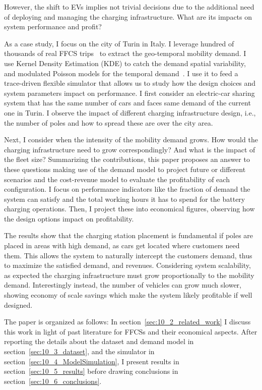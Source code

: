 However, the shift to EVs implies not trivial decisions due to the additional need of deploying and managing the charging infrastructure. What are its impacts on system performance and profit?

As a case study, I focus on the city of Turin in Italy. 
I leverage hundred of thousands of real FFCS trips~\cite{10_ciociola2017umap} to extract the geo-temporal mobility demand. I use Kernel Density Estimation (KDE) to catch the demand spatial variability, and modulated Poisson models for the temporal demand~\cite{ciociola2020}. 
I use it to feed a trace-driven flexible simulator that allows us to study how the design choices and system parameters impact on performance. I first consider an electric-car sharing system that has the same number of cars and faces same demand of the current one in Turin. I observe the impact of different charging infrastructure design, i.e., the number of poles and how to spread these are over the city area. 

Next, I consider when the intensity of the mobility demand grows. How would the charging infrastructure need to grow correspondingly? And what is the impact of the fleet size? 
Summarizing the contributions, this paper proposes an answer to these questions making use of the demand model to project future or different scenarios and the cost-revenue model to evaluate the profitability of each configuration.
I focus on performance indicators like the fraction of demand the system can satisfy and the total working hours it has to spend for the battery charging operations. 
Then, I project these into economical figures, observing how the design options impact on profitability. 


The results show that the charging station placement is fundamental if poles are placed in areas with high demand, as cars get located where customers need them. This allows the system to naturally intercept the customers demand, thus to maximize the satisfied demand, and revenues.
Considering system scalability, as expected the charging infrastructure must grow proportionally to the mobility demand. Interestingly instead, the number of vehicles can grow much slower, showing economy of scale savings which make the system likely profitable if well designed.

The paper is organized as follows: In section~\ref{sec:10_2_related_work} I discuss this work in light of past literature for FFCSs and their economical aspects. After reporting the details about the dataset and demand model in  section~\ref{sec:10_3_dataset}, and the simulator in section~\ref{sec:10_4_ModelSimulation}, I present results in section~\ref{sec:10_5_results} before drawing conclusions in section~\ref{sec:10_6_conclusions}.


